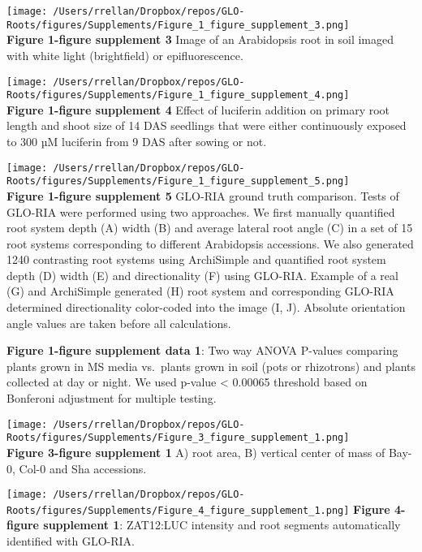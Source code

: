 \documentclass[]{article}
\begin{document}
\pagebreak

\texttt{[image: /Users/rrellan/Dropbox/repos/GLO-Roots/figures/Supplements/Figure\_1\_figure\_supplement\_3.png]}\\\textbf{Figure
1-figure supplement 3} Image of an Arabidopsis root in soil imaged with
white light (brightfield) or epifluorescence.

\pagebreak

\texttt{[image: /Users/rrellan/Dropbox/repos/GLO-Roots/figures/Supplements/Figure\_1\_figure\_supplement\_4.png]}\\\textbf{Figure
1-figure supplement 4} Effect of luciferin addition on primary root
length and shoot size of 14 DAS seedlings that were either continuously
exposed to 300 µM luciferin from 9 DAS after sowing or not.

\pagebreak

\texttt{[image: /Users/rrellan/Dropbox/repos/GLO-Roots/figures/Supplements/Figure\_1\_figure\_supplement\_5.png]}\\\textbf{Figure
1-figure supplement 5} GLO-RIA ground truth comparison. Tests of GLO-RIA
were performed using two approaches. We first manually quantified root
system depth (A) width (B) and average lateral root angle (C) in a set
of 15 root systems corresponding to different Arabidopsis accessions. We
also generated 1240 contrasting root systems using ArchiSimple and
quantified root system depth (D) width (E) and directionality (F) using
GLO-RIA. Example of a real (G) and ArchiSimple generated (H) root system
and corresponding GLO-RIA determined directionality color-coded into the
image (I, J). Absolute orientation angle values are taken before all
calculations.

\pagebreak

\textbf{Figure 1-figure supplement data 1}: Two way ANOVA P-values
comparing plants grown in MS media vs.~plants grown in soil (pots or
rhizotrons) and plants collected at day or night. We used p-value
\textless{} 0.00065 threshold based on Bonferoni adjustment for multiple
testing.

\pagebreak

\texttt{[image: /Users/rrellan/Dropbox/repos/GLO-Roots/figures/Supplements/Figure\_3\_figure\_supplement\_1.png]}\\\textbf{Figure
3-figure supplement 1} A) root area, B) vertical center of mass of
Bay-0, Col-0 and Sha accessions.

\pagebreak

\texttt{[image: /Users/rrellan/Dropbox/repos/GLO-Roots/figures/Supplements/Figure\_4\_figure\_supplement\_1.png]}
\textbf{Figure 4-figure supplement 1}: ZAT12:LUC intensity and root
segments automatically identified with GLO-RIA. \pagebreak
\end{document}
